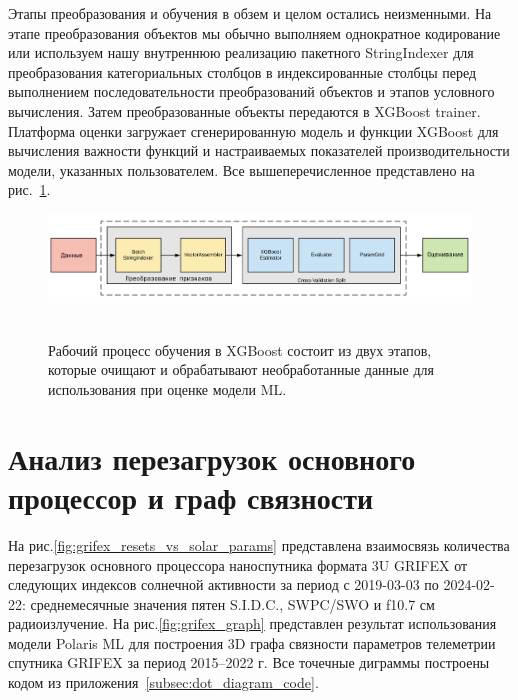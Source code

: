 \documentclass[14pt, a4paper]{extreport}
\begin{document}
    Этапы преобразования и обучения в обзем и целом остались неизменными.
    На этапе преобразования объектов мы обычно выполняем однократное кодирование или используем нашу внутреннюю реализацию пакетного StringIndexer для преобразования категориальных столбцов в индексированные столбцы перед выполнением последовательности преобразований объектов и этапов условного вычисления.
    Затем преобразованные объекты передаются в XGBoost trainer.
    Платформа оценки загружает сгенерированную модель и функции XGBoost для вычисления важности функций и настраиваемых показателей производительности модели, указанных пользователем.
    Все вышеперечисленное представлено на рис.~\ref{fig:xgboost_processing}.

    \begin{figure}[!htbp]
        \centering
        \includegraphics[width=1.0\textwidth]{xgboost_processing}
        ~\caption{Рабочий процесс обучения в XGBoost состоит из двух этапов, которые очищают и обрабатывают необработанные данные для использования при оценке модели ML.}
        \label{fig:xgboost_processing}
    \end{figure}

    \section{Анализ перезагрузок основного процессор и граф связности}

    На рис.\ref{fig:grifex_resets_vs_solar_params} представлена взаимосвязь количества перезагрузок основного процессора наноспутника формата 3U GRIFEX от следующих индексов солнечной активности за период с 2019-03-03 по 2024-02-22: среднемесячные значения пятен S.I.D.C., SWPC/SWO и f10.7 см радиоизлучение.
    На рис.\ref{fig:grifex_graph} представлен результат использования модели Polaris ML для построения 3D графа связности параметров телеметрии спутника GRIFEX за период 2015–2022 г.
    Все точечные диграммы построены кодом из приложения~\ref{subsec:dot_diagram_code}.
\end{document}
